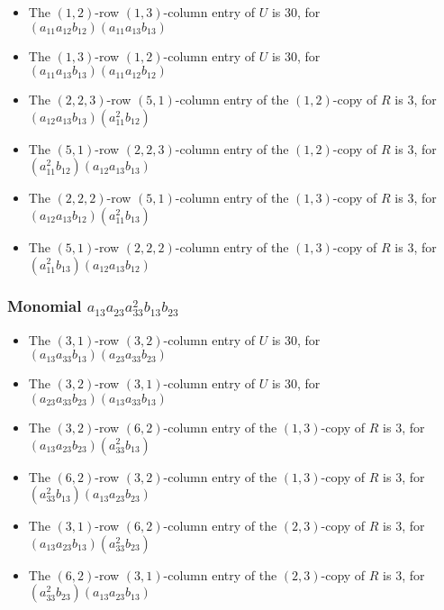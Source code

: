 \documentclass{article}
\begin{document}
\begin{itemize}
\item The $ \left(1, 2\right) $-row $ \left(1, 3\right) $-column entry of $U$ is $ 30 $, for $( a_{11} a_{12} b_{12} )( a_{11} a_{13} b_{13} )$ 
\item The $ \left(1, 3\right) $-row $ \left(1, 2\right) $-column entry of $U$ is $ 30 $, for $( a_{11} a_{13} b_{13} )( a_{11} a_{12} b_{12} )$ 
\item The $(2, 2, 3)$-row $(5, 1)$-column entry of the $ \left(1, 2\right) $-copy of $R$ is $ 3 $, for $( a_{12} a_{13} b_{13} )( a_{11}^{2} b_{12} )$ 
\item The $(5, 1)$-row $(2, 2, 3)$-column entry of the $ \left(1, 2\right) $-copy of $R$ is $ 3 $, for $( a_{11}^{2} b_{12} )( a_{12} a_{13} b_{13} )$ 
\item The $(2, 2, 2)$-row $(5, 1)$-column entry of the $ \left(1, 3\right) $-copy of $R$ is $ 3 $, for $( a_{12} a_{13} b_{12} )( a_{11}^{2} b_{13} )$ 
\item The $(5, 1)$-row $(2, 2, 2)$-column entry of the $ \left(1, 3\right) $-copy of $R$ is $ 3 $, for $( a_{11}^{2} b_{13} )( a_{12} a_{13} b_{12} )$ 
\end{itemize}
\subsubsection{Monomial $ a_{13} a_{23} a_{33}^{2} b_{13} b_{23} $}

\begin{itemize}
\item The $ \left(3, 1\right) $-row $ \left(3, 2\right) $-column entry of $U$ is $ 30 $, for $( a_{13} a_{33} b_{13} )( a_{23} a_{33} b_{23} )$ 
\item The $ \left(3, 2\right) $-row $ \left(3, 1\right) $-column entry of $U$ is $ 30 $, for $( a_{23} a_{33} b_{23} )( a_{13} a_{33} b_{13} )$ 
\item The $(3, 2)$-row $(6, 2)$-column entry of the $ \left(1, 3\right) $-copy of $R$ is $ 3 $, for $( a_{13} a_{23} b_{23} )( a_{33}^{2} b_{13} )$ 
\item The $(6, 2)$-row $(3, 2)$-column entry of the $ \left(1, 3\right) $-copy of $R$ is $ 3 $, for $( a_{33}^{2} b_{13} )( a_{13} a_{23} b_{23} )$ 
\item The $(3, 1)$-row $(6, 2)$-column entry of the $ \left(2, 3\right) $-copy of $R$ is $ 3 $, for $( a_{13} a_{23} b_{13} )( a_{33}^{2} b_{23} )$ 
\item The $(6, 2)$-row $(3, 1)$-column entry of the $ \left(2, 3\right) $-copy of $R$ is $ 3 $, for $( a_{33}^{2} b_{23} )( a_{13} a_{23} b_{13} )$ 
\end{itemize}
\end{document}
